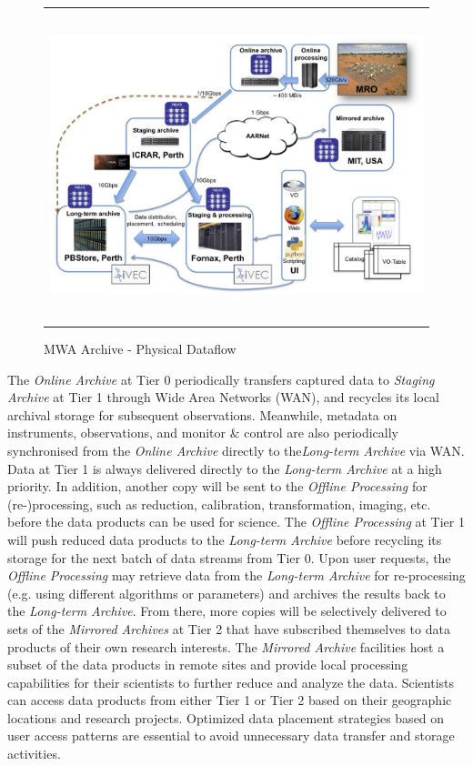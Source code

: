    \begin{figure}
   \begin{center}
   \begin{tabular}{c}
   \includegraphics[height=9cm]{part6/Wu_P34/P34_f2.eps}
   \end{tabular}
   \end{center}
   \caption[]
   { \label{fig:phy_dataflow} 
MWA Archive - Physical Dataflow}
   \end{figure} 

The \emph{Online Archive} at Tier 0 periodically transfers captured data to \emph{Staging Archive} at Tier 1 through Wide Area Networks (WAN), and recycles its local archival storage for subsequent observations. Meanwhile, metadata on instruments, observations, and monitor \& control are also periodically synchronised from the \emph{Online Archive} directly to the\emph{Long-term Archive} via WAN. Data at Tier 1 is always delivered directly to the \emph{Long-term Archive} at a high priority.  In addition, another copy will be sent to the \emph{Offline Processing} for (re-)processing, such as reduction, calibration, transformation, imaging, etc. before the data products can be used for science. The \emph{Offline Processing} at Tier 1 will push reduced data products to the \emph{Long-term Archive} before recycling its storage for the next batch of data streams from Tier 0. Upon user requests, the \emph{Offline Processing} may retrieve data from the \emph{Long-term Archive} for re-processing (e.g. using different algorithms or parameters) and archives the results back to the \emph{Long-term Archive}. From there, more copies will be selectively delivered to sets of the \emph{Mirrored Archives} at Tier 2 that have subscribed themselves to data products of their own research interests. The \emph{Mirrored Archive} facilities host a subset of the data products in remote sites and provide local processing capabilities for their scientists to further reduce and analyze the data. Scientists can access data products from either Tier 1 or Tier 2 based on their geographic locations and research projects. Optimized data placement strategies based on user access patterns are essential to avoid unnecessary data transfer and storage activities.


